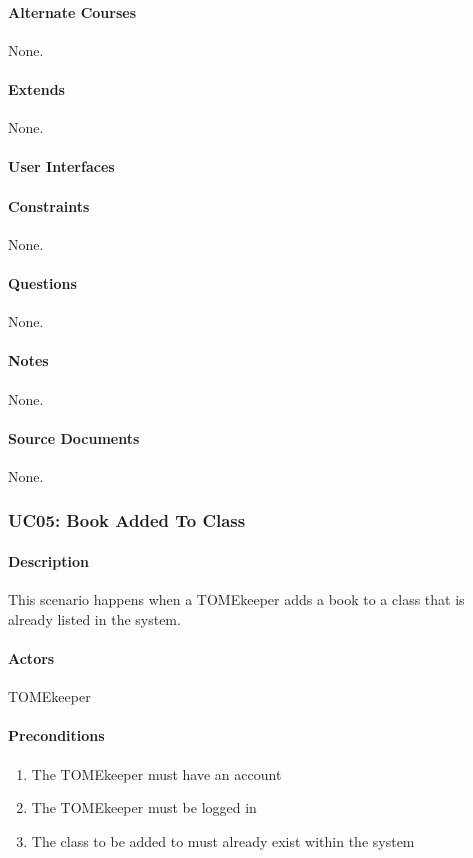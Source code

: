 \documentclass[12pt,titlepage]{article}
\begin{document}
\paragraph{Alternate Courses}
None.
\paragraph{Extends}
None.
\paragraph{User Interfaces}
\paragraph{Constraints}
None.
\paragraph{Questions}
None.
\paragraph{Notes}
None.
\paragraph{Source Documents}
None.

\subsubsection{UC05: Book Added To Class}
\paragraph{Description}
This scenario happens when a TOMEkeeper adds a book to a class that is already listed in the system.
\paragraph{Actors}
TOMEkeeper
\paragraph{Preconditions}
\begin{enumerate}
	\item The TOMEkeeper must have an account
	\item The TOMEkeeper must be logged in
	\item The class to be added to must already exist within the system
\end{enumerate}
\end{document}
